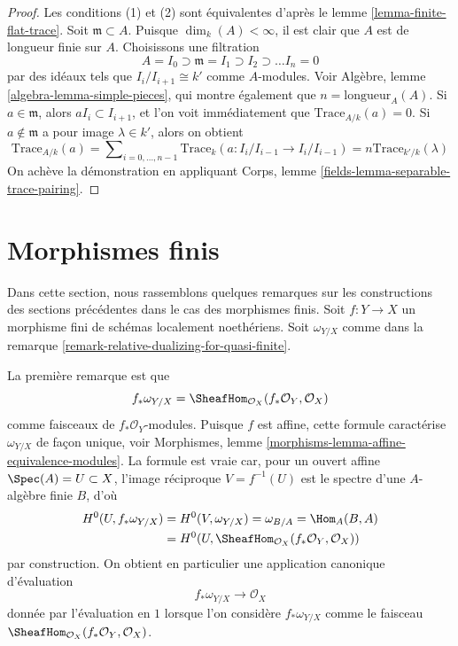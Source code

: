 \begin{proof}
Les conditions (1) et (2) sont équivalentes d'après le lemme \ref{lemma-finite-flat-trace}.
Soit $\mathfrak m \subset A$. Puisque $\dim_k(A) < \infty$, il est clair que
$A$ est de longueur finie sur $A$. Choisissons une filtration
$$
A = I_0 \supset \mathfrak m = I_1 \supset I_2 \supset \ldots I_n = 0
$$
par des idéaux tels que $I_i/I_{i + 1} \cong k'$ comme $A$-modules. Voir
Algèbre, lemme \ref{algebra-lemma-simple-pieces}, qui montre également que
$n = \text{longueur}_A(A)$. Si $a \in \mathfrak m$, alors $aI_i \subset I_{i + 1}$,
et l'on voit immédiatement que $\text{Trace}_{A/k}(a) = 0$.
Si $a \not \in \mathfrak m$ a pour image $\lambda \in k'$, alors
on obtient
$$
\text{Trace}_{A/k}(a) =
\sum\nolimits_{i = 0, \ldots, n - 1}
\text{Trace}_k(a : I_i/I_{i - 1} \to I_i/I_{i - 1}) =
n \text{Trace}_{k'/k}(\lambda)
$$
On achève la démonstration en appliquant
Corps, lemme \ref{fields-lemma-separable-trace-pairing}.
\end{proof}






\section{Morphismes finis}
\label{section-finite-morphisms}

\noindent
Dans cette section, nous rassemblons quelques remarques sur les
constructions des sections précédentes dans le cas des morphismes finis.
Soit $f : Y \to X$ un morphisme fini de schémas localement noethériens.
Soit $\omega_{Y/X}$ comme dans la
remarque \ref{remark-relative-dualizing-for-quasi-finite}.

\medskip\noindent
La première remarque est que
$$
f_*\omega_{Y/X} = \SheafHom_{\mathcal{O}_X}(f_*\mathcal{O}_Y, \mathcal{O}_X)
$$
comme faisceaux de $f_*\mathcal{O}_Y$-modules. Puisque $f$ est affine, cette
formule caractérise $\omega_{Y/X}$ de façon unique, voir
Morphismes, lemme \ref{morphisms-lemma-affine-equivalence-modules}.
La formule est vraie car, pour un ouvert affine $\Spec(A) = U \subset X$,
l'image réciproque $V = f^{-1}(U)$ est le spectre d'une $A$-algèbre finie
$B$, d'où
$$
\begin{aligned}
H^0(U, f_*\omega_{Y/X})
&= H^0(V, \omega_{Y/X}) = \omega_{B/A} = \Hom_A(B, A) \\
&= H^0(U, \SheafHom_{\mathcal{O}_X}(f_*\mathcal{O}_Y, \mathcal{O}_X))
\end{aligned}
$$
par construction. On obtient en particulier une application canonique d'évaluation
$$
f_*\omega_{Y/X} \longrightarrow \mathcal{O}_X
$$
donnée par l'évaluation en $1$ lorsque l'on considère $f_*\omega_{Y/X}$
comme le faisceau $\SheafHom_{\mathcal{O}_X}(f_*\mathcal{O}_Y, \mathcal{O}_X)$.

